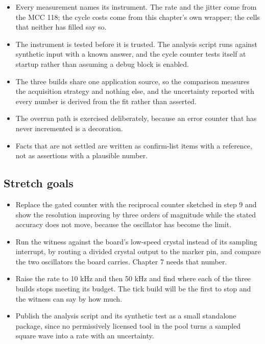 \begin{itemize}
\item Every measurement names its instrument. The rate and the jitter come from
the MCC 118; the cycle costs come from this chapter's own wrapper; the cells
that neither has filled say so.
\item The instrument is tested before it is trusted. The analysis script runs
against synthetic input with a known answer, and the cycle counter tests itself
at startup rather than assuming a debug block is enabled.
\item The three builds share one application source, so the comparison measures
the acquisition strategy and nothing else, and the uncertainty reported with
every number is derived from the fit rather than asserted.
\item The overrun path is exercised deliberately, because an error counter that
has never incremented is a decoration.
\item Facts that are not settled are written as confirm-list items with a
reference, not as assertions with a plausible number.
\end{itemize}

\subsection*{Stretch goals}

\begin{itemize}
\item Replace the gated counter with the reciprocal counter sketched in step 9
and show the resolution improving by three orders of magnitude while the stated
accuracy does not move, because the oscillator has become the limit.
\item Run the witness against the board's low-speed crystal instead of its
sampling interrupt, by routing a divided crystal output to the marker pin, and
compare the two oscillators the board carries. Chapter 7 needs that number.
\item Raise the rate to 10 kHz and then 50 kHz and find where each of the three
builds stops meeting its budget. The tick build will be the first to stop and
the witness can say by how much.
\item Publish the analysis script and its synthetic test as a small standalone
package, since no permissively licensed tool in the pool turns a sampled square
wave into a rate with an uncertainty.
\end{itemize}


